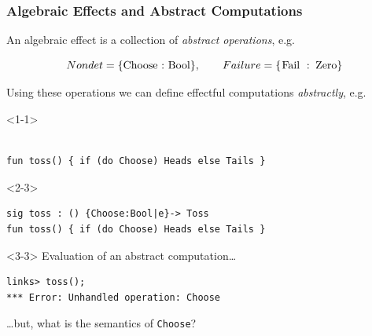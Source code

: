 \documentclass[10pt,compress]{beamer}
\begin{document}
\begin{frame}[fragile]
\frametitle{Algebraic Effects and Abstract Computations}
An algebraic effect is a collection of \emph{abstract operations}, e.g.

\[ 
Nondet = \{\text{\lstinline$Choose : Bool$}\}, \qquad Failure = \{\text{\lstinline$Fail : Zero$}\}
\]

Using these operations we can define effectful computations \emph{abstractly}, e.g.
\begin{onlyenv}<1-1>
\begin{lstlisting}

fun toss() { if (do Choose) Heads else Tails }
\end{lstlisting}
\end{onlyenv}
%

%
\begin{onlyenv}<2-3>
\begin{lstlisting}
sig toss : () {Choose:Bool|e}-> Toss
fun toss() { if (do Choose) Heads else Tails }
\end{lstlisting}
\end{onlyenv}
%


%


\begin{uncoverenv}<3-3>
Evaluation of an abstract computation\dots
\begin{lstlisting}[style=terminal]
links> toss();
*** Error: Unhandled operation: Choose
\end{lstlisting}
\dots but, what is the semantics of \lstinline$Choose$?
\end{uncoverenv}

\end{frame}
\end{document}
